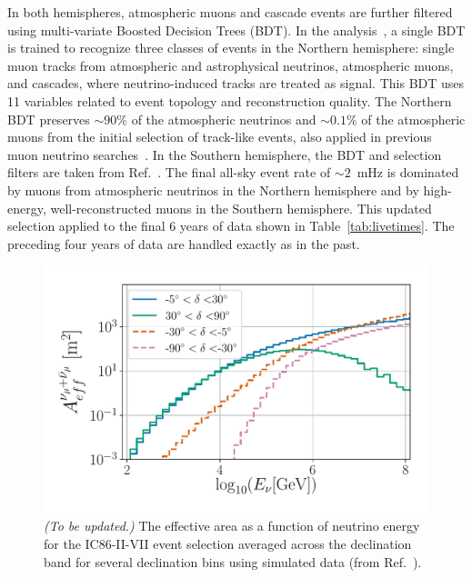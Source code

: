 \documentclass[aps,10pt,prd,twocolumn,floats,letterpaper,showpacs,nofootinbib,bibnotes,notitlepage,superscriptaddress,floatfix]{revtex4-1}
\newcommand{\MA}[1]{{\color{magenta}#1}}
\begin{document}
In both hemispheres, atmospheric muons and cascade events are further filtered using multi-variate Boosted Decision Trees (BDT). In the analysis~\cite{Aartsen:2019fau}, a single BDT is trained to recognize three classes of events in the Northern hemisphere: single muon tracks from atmospheric and astrophysical neutrinos, atmospheric muons, and cascades, where neutrino-induced tracks are treated as signal. This BDT uses 11 variables related to event topology and reconstruction quality. The Northern BDT preserves $\sim90\%$ of the atmospheric neutrinos and $\sim0.1\%$ of the atmospheric muons from the initial selection of track-like events, also applied in previous muon neutrino searches~\cite{Aartsen:2016oji,Aartsen:2018ywr}. In the Southern hemisphere, the BDT and selection filters are taken from Ref.~\cite{Aartsen:2016oji}. The final all-sky event rate of $\sim2$~mHz is dominated by muons from atmospheric neutrinos in the Northern hemisphere and by high-energy, well-reconstructed muons in the Southern hemisphere. This updated selection applied to the final 6 years of data shown in Table~\ref{tab:livetimes}. The preceding four years of data are handled exactly as in the past.

\begin{figure}[t]
\centering
\includegraphics[width=\linewidth]{IC86II_effA.pdf}
\caption[]{\MA{\it (To be updated.)} The effective area as a function of neutrino energy for the IC86-II-VII event selection averaged across the declination band for several declination bins using simulated data (from Ref.~\cite{Aartsen:2019fau}).}\label{fig:effA}
\end{figure}
\end{document}
